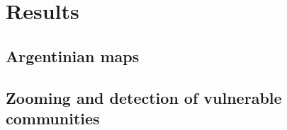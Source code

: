 \section{Results}


\subsection{Argentinian maps}

\subsection{Zooming and detection of vulnerable communities}

